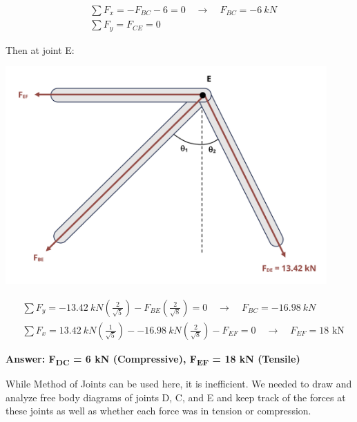 \documentclass[
  letterpaper,
  DIV=11,
  numbers=noendperiod]{scrreprt}
\begin{document}
\begin{tcolorbox}
\begin{tcolorbox}
\[
\begin{aligned}
&\sum F_x=-F_{B C}-6=0 \quad\rightarrow\quad F_{B C}=-6{~kN}\\
&\sum F_y=F_{C E}=0
\end{aligned}
\]

Then at joint E:

\begin{center}
\includegraphics[width=4.84375in,height=\textheight]{images/CH1 PNGs/example 1.4 part 4.png}
\end{center}

\[
\begin{aligned}
&\sum F_y=-13.42{~kN}\left(\frac{2}{\sqrt{5}}\right)-F_{B E}\left(\frac{2}{\sqrt{8}}\right)=0 \quad\rightarrow\quad F_{B C}=-16.98{~kN}\\
&\sum F_x=13.42{~kN}\left(\frac{1}{\sqrt{5}}\right)--16.98{~kN}\left(\frac{2}{\sqrt{8}}\right)-F_{E F}=0 \quad\rightarrow\quad F_{E F}=18\text{ kN}
\end{aligned}
\]

\textbf{Answer: F\textsubscript{DC} = 6 kN (Compressive),
F\textsubscript{EF} = 18 kN (Tensile)}

\end{tcolorbox}

\begin{tcolorbox}[enhanced jigsaw, breakable, opacityback=0, toptitle=1mm, left=2mm, colback=white, opacitybacktitle=0.6, colframe=quarto-callout-tip-color-frame, titlerule=0mm, arc=.35mm, leftrule=.75mm, bottomtitle=1mm, colbacktitle=quarto-callout-tip-color!10!white, rightrule=.15mm, title={Solution - Method of Sections}, bottomrule=.15mm, toprule=.15mm, coltitle=black]

While Method of Joints can be used here, it is inefficient. We needed to
draw and analyze free body diagrams of joints D, C, and E and keep track
of the forces at these joints as well as whether each force was in
tension or compression.


\end{tcolorbox}
\end{tcolorbox}
\end{document}
